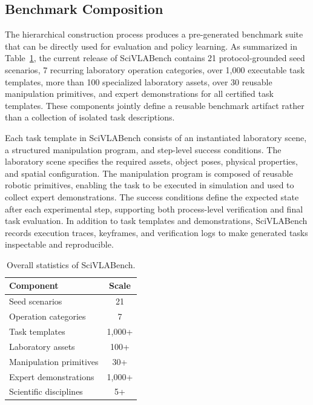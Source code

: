 \subsection{Benchmark Composition}
\label{sec:benchmark-composition}

The hierarchical construction process produces a pre-generated benchmark suite that can be directly used for evaluation and policy learning. As summarized in Table~\ref{tab:benchmark-statistics}, the current release of SciVLABench contains 21 protocol-grounded seed scenarios, 7 recurring laboratory operation categories, over 1,000 executable task templates, more than 100 specialized laboratory assets, over 30 reusable manipulation primitives, and expert demonstrations for all certified task templates. These components jointly define a reusable benchmark artifact rather than a collection of isolated task descriptions.

Each task template in SciVLABench consists of an instantiated laboratory scene, a structured manipulation program, and step-level success conditions. The laboratory scene specifies the required assets, object poses, physical properties, and spatial configuration. The manipulation program is composed of reusable robotic primitives, enabling the task to be executed in simulation and used to collect expert demonstrations. The success conditions define the expected state after each experimental step, supporting both process-level verification and final task evaluation. In addition to task templates and demonstrations, SciVLABench records execution traces, keyframes, and verification logs to make generated tasks inspectable and reproducible.

\begin{table}[t]
  \centering
  \caption{Overall statistics of SciVLABench.}
  \label{tab:benchmark-statistics}
  \small
  \setlength{\tabcolsep}{5pt}
  \renewcommand{\arraystretch}{1.12}
  \begin{tabular}{p{3.2cm} c}
    \toprule
    \textbf{Component} & \textbf{Scale} \\
    \midrule
    Seed scenarios & 21 \\
    Operation categories & 7 \\
    Task templates & 1,000+ \\
    Laboratory assets & 100+ \\
    Manipulation primitives & 30+ \\
    Expert demonstrations & 1,000+ \\
    Scientific disciplines & 5+ \\
    \bottomrule
  \end{tabular}
\end{table}

